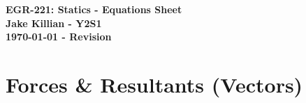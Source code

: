 \documentclass[10pt]{article}
\begin{document}
\small  %

\begin{center}
\textbf{EGR-221: Statics - Equations Sheet} \\
\textbf{Jake Killian - Y2S1} \\
\textbf{{\today} - Revision} \\
\end{center}


\section{Forces \& Resultants (Vectors)}
\end{document}
